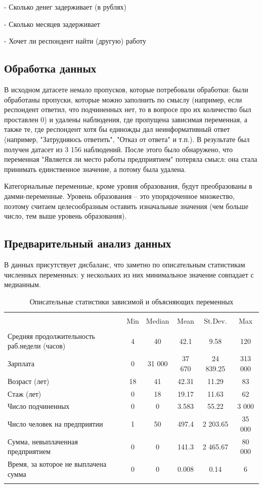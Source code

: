 \documentclass[12pt, a4paper]{article}
\begin{document}
{		-   Сколько денег задерживает (в рублях)
		
		-   Сколько месяцев задерживает
		
		-   Хочет ли респондент найти (другую) работу
		
		\subsection{Обработка данных}
		В исходном датасете немало пропусков, которые потребовали обработки: были обработаны пропуски, которые можно заполнить по смыслу (например, если респондент ответил, что подчиненных нет, то в вопросе про их количество был проставлен 0) и удалены наблюдения, где пропущена зависимая переменная, а также те, где респондент хотя бы единожды дал неинформативный ответ (например, "Затрудняюсь ответить", "Отказ от ответа" и т.п.). В результате был получен датасет из 3 156 наблюдений. После этого было обнаружено, что переменная "Является ли место работы предприятием" потеряла смысл: она стала принимать единственное значение, а потому была удалена. 
		
		Категориальные переменные, кроме уровня образования, будут преобразованы в дамми-переменные. Уровень образования -- это упорядоченное множество, поэтому считаем целесообразным оставить изначальные значения (чем больше число, тем выше уровень образования). 
		
		\subsection{Предварительный анализ данных}
		В данных присутствует дисбаланс, что заметно по описательным статистикам численных переменных: у нескольких из них минимальное значение совпадает с медианным. 
		\begin{table}[h] 
			\centering 
			\caption{Описательные статистики зависимой и объясняющих переменных} 
			\label{tab:descriptive_stats} 
			\begin{tabular}{@{}p{8cm}ccccc@{}} \hline 
				\hline \\[-1.8ex] 
				& Min & Median & Mean & St.Dev. & Max \\
				\hline \\[-1.8ex] 
				Средняя продолжительность раб.недели (часов)& 4 & 40 & 42.1 & 9.58 & 120 \\
				Зарплата & 0 & 31 000 & 37 670 & 24 839.25 & 313 000 \\
				Возраст (лет) & 18 & 41 & 42.31 & 11.29 & 83 \\
				Стаж (лет) & 0 & 18 & 19.17 & 11.63 & 62 \\
				Число подчиненных & 0 & 0 & 3.583 & 55.22 & 3 000 \\
				Число человек на предприятии & 1 & 50 & 497.4 & 2 203.65 & 35 000 \\
				Сумма, невыплаченная предприятием & 0 & 0 & 141.3 & 2 465.67 & 80 000 \\
				Время, за которое не выплачена сумма & 0 & 0 & 0.008 & 0.14 & 6 \\
				\hline \\[-1.8ex] 
			\end{tabular}
		\end{table} 
		
}
\end{document}
